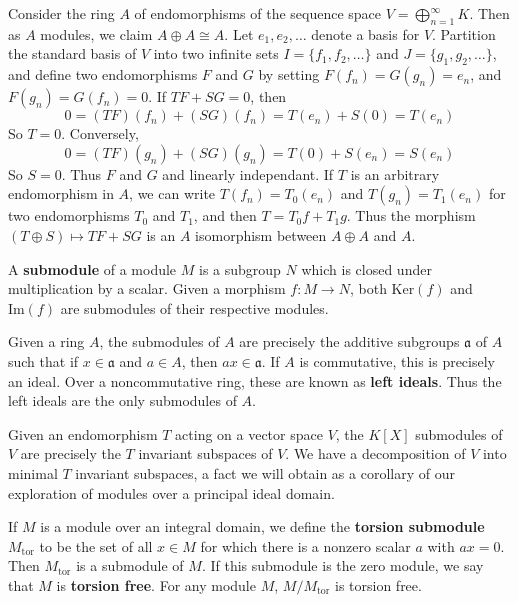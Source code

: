 \begin{example}
    Consider the ring $A$ of endomorphisms of the sequence space $V = \bigoplus_{n = 1}^\infty K$. Then as $A$ modules, we claim $A \oplus A \cong A$. Let $e_1, e_2, \dots$ denote a basis for $V$. Partition the standard basis of $V$ into two infinite sets $I = \{ f_1, f_2, \dots \}$ and $J = \{ g_1, g_2, \dots \}$, and define two endomorphisms $F$ and $G$ by setting $F(f_n) = G(g_n) = e_n$, and $F(g_n) = G(f_n) = 0$. If $TF + SG = 0$, then
    \[ 0 = (TF)(f_n) + (SG)(f_n) = T(e_n) + S(0) = T(e_n) \]
    So $T = 0$. Conversely,
    \[ 0 = (TF)(g_n) + (SG)(g_n) = T(0) + S(e_n) = S(e_n) \]
    So $S = 0$. Thus $F$ and $G$ and linearly independant. If $T$ is an arbitrary endomorphism in $A$, we can write $T(f_n) = T_0(e_n)$ and $T(g_n) = T_1(e_n)$ for two endomorphisms $T_0$ and $T_1$, and then $T = T_0 f + T_1 g$. Thus the morphism $(T \oplus S) \mapsto TF + SG$ is an $A$ isomorphism between $A \oplus A$ and $A$. 
\end{example}

A {\bf submodule} of a module $M$ is a subgroup $N$ which is closed under multiplication by a scalar. Given a morphism $f: M \to N$, both $\text{Ker}(f)$ and $\text{Im}(f)$ are submodules of their respective modules.

\begin{example}
    Given a ring $A$, the submodules of $A$ are precisely the additive subgroups $\mathfrak{a}$ of $A$ such that if $x \in \mathfrak{a}$ and $a \in A$, then $ax \in \mathfrak{a}$. If $A$ is commutative, this is precisely an ideal. Over a noncommutative ring, these are known as {\bf left ideals}. Thus the left ideals are the only submodules of $A$.
\end{example}

\begin{example}
    Given an endomorphism $T$ acting on a vector space $V$, the $K[X]$ submodules of $V$ are precisely the $T$ invariant subspaces of $V$. We have a decomposition of $V$ into minimal $T$ invariant subspaces, a fact we will obtain as a corollary of our exploration of modules over a principal ideal domain.
\end{example}

\begin{example}
    If $M$ is a module over an integral domain, we define the {\bf torsion submodule} $M_{\text{tor}}$ to be the set of all $x \in M$ for which there is a nonzero scalar $a$ with $ax = 0$. Then $M_{\text{tor}}$ is a submodule of $M$. If this submodule is the zero module, we say that $M$ is {\bf torsion free}. For any module $M$, $M/M_{\text{tor}}$ is torsion free.
\end{example}

